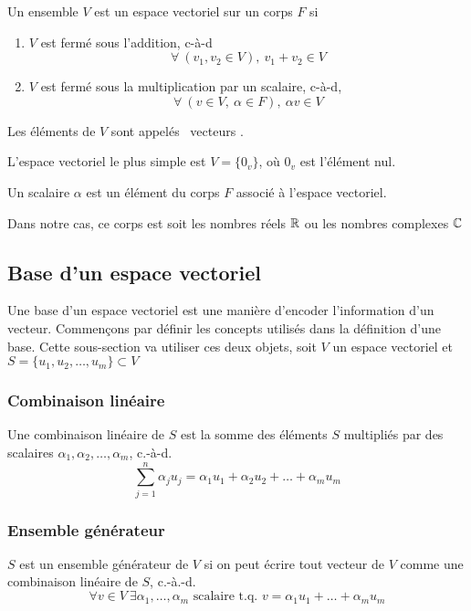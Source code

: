 \begin{definition}
      Un ensemble $V$ est un espace vectoriel sur un corps $F$
      si \begin{enumerate}[1)]
            \item $V$ est fermé sous l'addition, c-à-d 
            \[ \forall \ (v_1, v_2 \in V), \ v_1 + v_2 \in V \]
            \item $V$ est fermé sous la multiplication par un scalaire, c-à-d, \[ \forall \ (v \in V, \ \alpha \in F), \ \alpha v \in V \]
      \end{enumerate}
      Les éléments de $V$ sont appelés \guillemetleft \ vecteurs \guillemetright.
\end{definition}
\begin{remark}
      L'espace vectoriel le plus simple est $V = \{ 0_v \}$, où $0_v$ est l'élément nul.
\end{remark}
\begin{definition}
      Un scalaire $\alpha$ est un élément du corps $F$ associé à l'espace vectoriel.
\end{definition}
\begin{note}
    Dans notre cas, ce corps est soit les nombres réels $\mathbb{R}$ ou les nombres complexes $\mathbb{C}$
\end{note}

\subsection{Base d'un espace vectoriel}
Une base d'un espace vectoriel est une manière d'encoder l'information d'un vecteur. Commençons par définir les concepts utilisés dans la définition d'une base. Cette sous-section va utiliser ces deux objets, soit $V$ un espace vectoriel et $S = \{ u_1, u_2, \ldots, u_m \} \subset V$

\subsubsection{Combinaison linéaire}
\begin{definition} Une combinaison linéaire de $S$ est la somme des éléments $S$ multipliés par des scalaires $\alpha_1, \alpha_2, \ldots, \alpha_m$, c.-à-d. 
\[ \sum_{j = 1}^{n}\alpha_j u_j = \alpha_1 u_1 + \alpha_2 u_2 + \ldots + \alpha_m u_m \]
\end{definition}

\subsubsection{Ensemble générateur}
\begin{definition}
      $S$ est un ensemble générateur de $V$ si on peut écrire tout vecteur de $V$ comme une combinaison linéaire de $S$, c.-à.-d.
      \[ \forall v \in V  \ \exists \alpha_1, \ldots, \alpha_m \text{ scalaire t.q. } v = \alpha_1 u_1 + \ldots + \alpha_m u_m\]
\end{definition}

